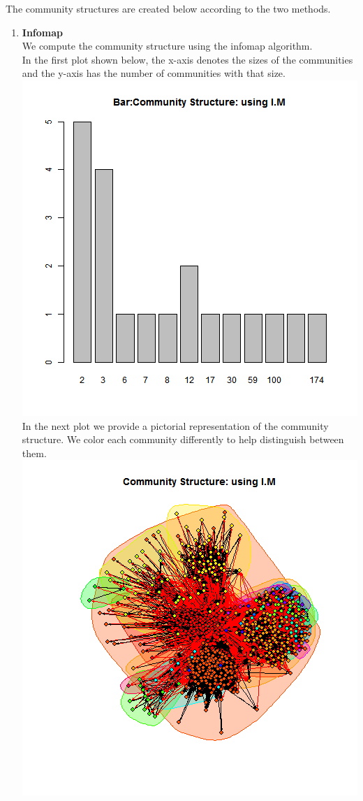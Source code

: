 \documentclass{article}
\begin{document}
The community structures are created below according to the two methods.\\
\begin{enumerate}
 \item \textbf{Infomap}\\
 We compute the community structure using the infomap algorithm.\\
 In the first plot shown below, the x-axis denotes the sizes of the communities and the y-axis has the number of communities with that size.\\
	\includegraphics[scale=0.4]{7_2b} \\
	In the next plot we provide a pictorial representation of the community structure.
	We color each community differently to help distinguish between them.\\
	\includegraphics[scale=0.7]{7_2c} \\ 


\end{enumerate}
\end{document}
